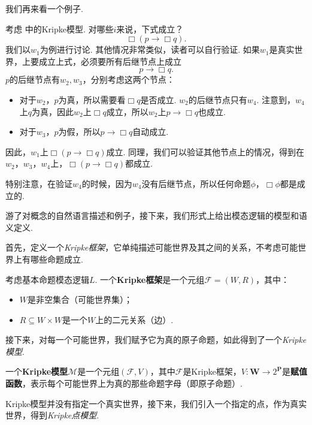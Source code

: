 我们再来看一个例子. 

\begin{example}\label{ex:kripke-model-basic}
考虑 中的Kripke模型. 对哪些$i$来说，下式成立？
\[\Box (p\to\Box q).\]
我们以$w_1$为例进行讨论. 其他情况非常类似，读者可以自行验证. 如果$w_1$是真实世界，上要成立上式，必须要所有后继节点上成立
    \[p\to\Box q.\]
$p$的后继节点有$w_2,w_3$，分别考虑这两个节点：
\begin{itemize}
    \item 对于$w_2$，$p$为真，所以需要看$\Box q$是否成立. $w_2$的后继节点只有$w_4$. 注意到，$w_4$上$q$为真，因此$w_2$上$\Box q$成立，所以$w_2$上$p\to\Box q$也成立. 
    \item 对于$w_3$，$p$为假，所以$p\to\Box q$自动成立. 
\end{itemize}
因此，$w_1$上$\Box (p\to\Box q)$成立. 同理，我们可以验证其他节点上的情况，得到在$w_2$，$w_3$，$w_4$上，$\Box (p\to\Box q)$都成立. 

特别注意，在验证$w_4$的时候，因为$w_4$没有后继节点，所以任何命题$\phi$，$\Box\phi$都是成立的. 
\end{example}

游了对概念的自然语言描述和例子，接下来，我们形式上给出模态逻辑的模型和语义定义. 

首先，定义一个\textit{Kripke框架}，它单纯描述可能世界及其之间的关系，不考虑可能世界上有哪些命题成立. 

\begin{definition}[Kripke框架]
考虑基本命题模态逻辑$L$. 一个\textbf{Kripke框架}是一个元组$\mathcal F=(W,R)$，其中：
\begin{itemize}
\item $W$是非空集合（可能世界集）；
\item $R\subseteq W\times W$是一个$W$上的二元关系（边）. 
\end{itemize}
\end{definition}

接下来，对每一个可能世界，我们赋予它为真的原子命题，如此得到了一个\textit{Kripke模型}. 

\begin{definition}[Kripke模型]
一个\textbf{Kripke模型}$\mathcal{M}$是一个元组$(\mathcal F,V)$，其中$\mathcal F$是Kripke框架，$V:\mathbf W\to 2^{\mathbf P}$是\textbf{赋值函数}，表示每个可能世界上为真的那些命题字母（即原子命题）. 
\end{definition}

Kripke模型并没有指定一个真实世界，接下来，我们引入一个指定的点，作为真实世界，得到\textit{Kripke点模型}. 

